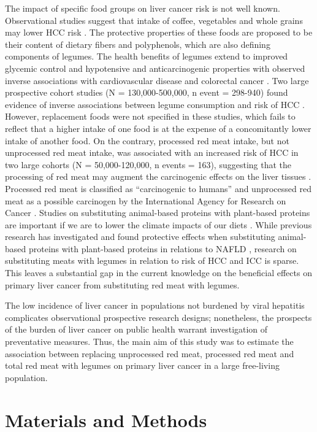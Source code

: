 \documentclass[nutrients,article,submit,moreauthors,pdftex]{Definitions/mdpi}
\begin{document}
The impact of specific food groups on liver cancer risk is not well
known. Observational studies suggest that intake of coffee, vegetables
and whole grains may lower HCC risk \citep{zhang2013, yang2014, Liu2021, Bhurwal2020}. The protective properties of these foods are proposed to
be their content of dietary fibers and polyphenols, which are also
defining components of legumes. The health benefits of legumes extend to
improved glycemic control and hypotensive and anticarcinogenic
properties with observed inverse associations with cardiovascular
disease and colorectal cancer \citep{viguiliouk2019, jin2022}. Two large
prospective cohort studies (N = 130,000-500,000, n event = 298-940)
found evidence of inverse associations between legume consumption and
risk of HCC \citep{zhang2013, Liu2021}. However, replacement foods were not
specified in these studies, which fails to reflect that a higher intake
of one food is at the expense of a concomitantly lower intake of another
food. On the contrary, processed red meat intake, but not unprocessed
red meat intake, was associated with an increased risk of HCC in two
large cohorts (N = 50,000-120,000, n events = 163), suggesting that the
processing of red meat may augment the carcinogenic effects on the liver
tissues \citep{Ma2019}. Processed red meat is classified as ``carcinogenic to
humans'' and unprocessed red meat as a possible carcinogen by the
International Agency for Research on Cancer \citep{Bouvard2015}. Studies on
substituting animal-based proteins with plant-based proteins are
important if we are to lower the climate impacts of our diets \citep{RN71}.
While previous research has investigated and found protective effects
when substituting animal-based proteins with plant-based proteins in
relations to NAFLD \citep{Zhang2023}, research on substituting meats with
legumes in relation to risk of HCC and ICC is sparse. This leaves a
substantial gap in the current knowledge on the beneficial effects on
primary liver cancer from substituting red meat with legumes.

The low incidence of liver cancer in populations not burdened by viral
hepatitis complicates observational prospective research designs;
nonetheless, the prospects of the burden of liver cancer on public
health warrant investigation of preventative measures. Thus, the main
aim of this study was to estimate the association between replacing
unprocessed red meat, processed red meat and total red meat with legumes
on primary liver cancer in a large free-living population.

\hypertarget{sec2}{%
\section{Materials and Methods}\label{sec2}}
\end{document}
